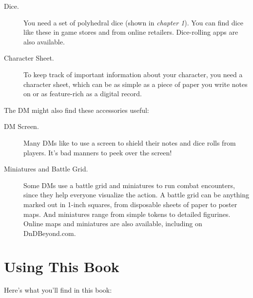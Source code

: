 \documentclass[10pt,a4paper,twoside,bg=print,twocolumn,openany,nodeprecatedcode]{dndbook}
\begin{document}
\begin{description}
\item[Dice.]
You need a set of polyhedral dice (shown in \textit{chapter 1}). You can find dice like these in game stores and from online retailers. Dice-rolling apps are also available.
\item[Character Sheet.]
To keep track of important information about your character, you need a character sheet, which can be as simple as a piece of paper you write notes on or as feature-rich as a digital record.
\end{description}

The DM might also find these accessories useful:


\begin{description}
\item[DM Screen.]
Many DMs like to use a screen to shield their notes and dice rolls from players. It's bad manners to peek over the screen!
\item[Miniatures and Battle Grid.]
Some DMs use a battle grid and miniatures to run combat encounters, since they help everyone visualize the action. A battle grid can be anything marked out in 1-inch squares, from disposable sheets of paper to poster maps. And miniatures range from simple tokens to detailed figurines. Online maps and miniatures are also available, including on DnDBeyond.com.
\end{description}

\section{Using This Book}
Here's what you'll find in this book:
\end{document}
